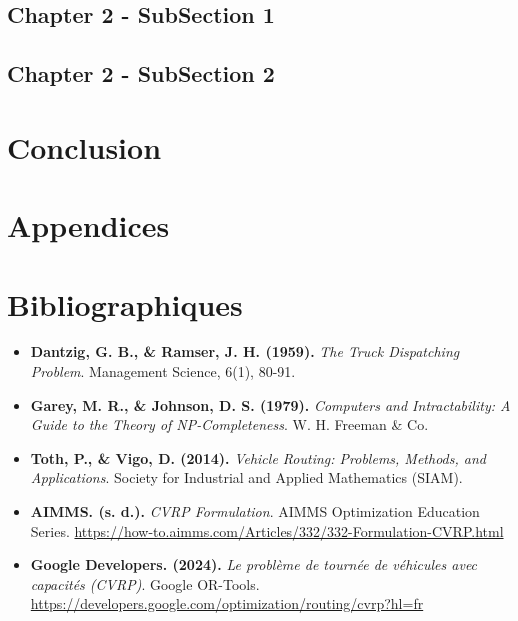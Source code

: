 \subsection*{Chapter 2 - SubSection 1}
{}

\subsection*{Chapter 2 - SubSection 2}
{}

\newpage

\section*{Conclusion}

\newpage

\section*{Appendices}

\newpage

\section*{Bibliographiques}
\begin{itemize}
    \item \textbf{Dantzig, G. B., \& Ramser, J. H. (1959).} \textit{The Truck Dispatching Problem}. Management Science, 6(1), 80-91.
    \item \textbf{Garey, M. R., \& Johnson, D. S. (1979).} \textit{Computers and Intractability: A Guide to the Theory of NP-Completeness}. W. H. Freeman \& Co.
    \item \textbf{Toth, P., \& Vigo, D. (2014).} \textit{Vehicle Routing: Problems, Methods, and Applications}. Society for Industrial and Applied Mathematics (SIAM).
    \item \textbf{AIMMS. (s. d.).} \textit{CVRP Formulation}. AIMMS Optimization Education Series. \url{https://how-to.aimms.com/Articles/332/332-Formulation-CVRP.html} 
    \item \textbf{Google Developers. (2024).} \textit{Le problème de tournée de véhicules avec capacités (CVRP)}. Google OR-Tools. \url{https://developers.google.com/optimization/routing/cvrp?hl=fr}
\end{itemize}